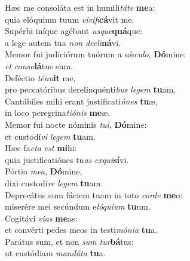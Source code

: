 \evenverse Hæc me consoláta est in humili\textit{tá}\textit{te} \textbf{me}a:~\*\\
\evenverse quia elóquium tuum \textit{vi}\textit{vi}\textit{fi}\textbf{cá}vit me.\\
\oddverse Supérbi iníque agébant \textit{us}\textit{que}\textbf{quá}que:~\*\\
\oddverse a lege autem tua \textit{non} \textit{de}\textit{cli}\textbf{ná}vi.\\
\evenverse Memor fui judiciórum tuórum a sǽ\textit{cu}\textit{lo}, \textbf{Dó}mine:~\*\\
\evenverse \textit{et} \textit{con}\textit{so}\textbf{lá}tus sum.\\
\oddverse Deféctio \textit{té}\textit{nu}\textbf{it} me,~\*\\
\oddverse pro peccatóribus derelinquénti\textit{bus} \textit{le}\textit{gem} \textbf{tu}am.\\
\evenverse Cantábiles mihi erant justificati\textit{ó}\textit{nes} \textbf{tu}æ,~\*\\
\evenverse in loco peregrina\textit{ti}\textit{ó}\textit{nis} \textbf{me}æ.\\
\oddverse Memor fui nocte nóminis \textit{tu}\textit{i}, \textbf{Dó}mine:~\*\\
\oddverse et custodí\textit{vi} \textit{le}\textit{gem} \textbf{tu}am.\\
\evenverse Hæc fa\textit{cta} \textit{est} \textbf{mi}hi:~\*\\
\evenverse quia justificatiónes tu\textit{as} \textit{ex}\textit{qui}\textbf{sí}vi.\\
\oddverse Pórtio \textit{me}\textit{a}, \textbf{Dó}mine,~\*\\
\oddverse dixi custodí\textit{re} \textit{le}\textit{gem} \textbf{tu}am.\\
\evenverse Deprecátus sum fáciem tuam in toto \textit{cor}\textit{de} \textbf{me}o:~\*\\
\evenverse miserére mei secúndum e\textit{ló}\textit{qui}\textit{um} \textbf{tu}um.\\
\oddverse Cogitávi \textit{vi}\textit{as} \textbf{me}as:~\*\\
\oddverse et convérti pedes meos in testi\textit{mó}\textit{ni}\textit{a} \textbf{tu}a.\\
\evenverse Parátus sum, et non \textit{sum} \textit{tur}\textbf{bá}tus:~\*\\
\evenverse ut custódiam \textit{man}\textit{dá}\textit{ta} \textbf{tu}a.\\
